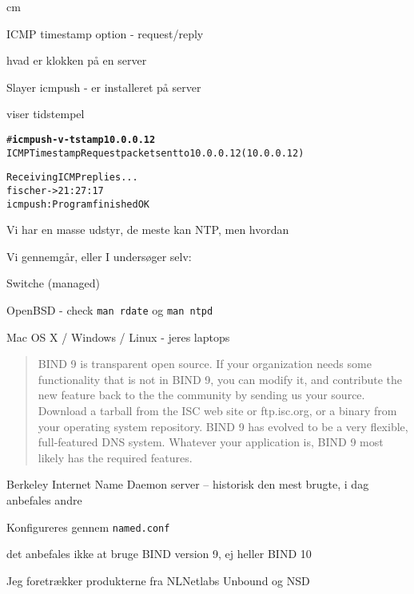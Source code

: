 \documentclass[Screen16to9,17pt]{foils}
\begin{document}
 cm

\begin{list1}
  \item ICMP timestamp option - request/reply
\item hvad er klokken på en server
\item Slayer icmpush - er installeret på server
\item viser tidstempel
\end{list1}

\begin{alltt}
# {\bfseries icmpush -v -tstamp 10.0.0.12}
ICMP Timestamp Request packet sent to 10.0.0.12 (10.0.0.12)

Receiving ICMP replies ...
fischer         -> 21:27:17
icmpush: Program finished OK
\end{alltt}



\begin{list1}
\item Vi har en masse udstyr, de meste kan NTP, men hvordan
\item Vi gennemgår, eller I undersøger selv:
\begin{list2}
\item Switche (managed)
\item OpenBSD - check \verb+man rdate+ og \verb+man ntpd+
\item Mac OS X / Windows / Linux - jeres laptops
\end{list2}
\end{list1}






\begin{quote}
BIND 9 is transparent open source. If your organization needs some functionality that is not in BIND 9, you can modify it, and contribute the new feature back to the the community by sending us your source. Download a tarball from the ISC web site or ftp.isc.org, or a binary from your operating system repository.
BIND 9 has evolved to be a very flexible, full-featured DNS system. Whatever your application is, BIND 9 most likely has the required features.\\
\end{quote}

\begin{list1}
\item Berkeley Internet Name Daemon server -- historisk den mest brugte, i dag anbefales andre
\item Konfigureres gennem \verb+named.conf+
\item det anbefales ikke at bruge BIND version 9, ej heller BIND 10
\item Jeg foretrækker produkterne fra NLNetlabs Unbound og NSD
\end{list1}
\end{document}
